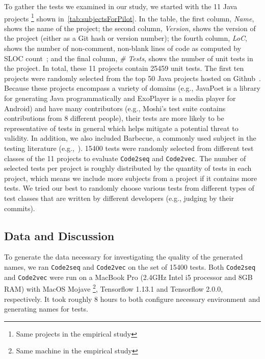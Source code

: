 \begin{appendices}
To gather the tests we examined in our study, we started with the \num{11} Java projects \footnote{Same projects in the empirical study} shown in~\cref{tab:subjectsForPilot}.
%
In the table, the first column, \emph{Name}, shows the name of the project; the second column, \emph{Version}, shows the version of the project (either as a Git hash or version number); the fourth column, \emph{LoC}, shows the number of non-comment, non-blank lines of code as computed by SLOC count~\cite{nguyen2007sloc}; and the final column, \emph{\# Tests}, shows the number of unit tests in the project. In total, these \num{11} projects contain \num{25459} unit tests.
%
The first ten projects were randomly selected from the top \num{50} Java projects hosted on Github~\cite{top50projects}.
%
Because these projects encompass a variety of domains (e.g., JavaPoet is a library for generating Java programmatically and ExoPlayer is a media player for Android) and have many contributors (e.g., Moshi’s test suite contains contributions from \num{8} different people), their tests are more likely to be representative of tests in general which helps mitigate a potential threat to validity.
%
In addition, we also included Barbecue, a commonly used subject in the testing literature (e.g.,~\cite{zhang2015automatically, zhang2016towards, wu2020pattern}).
\num{15400} tests were randomly selected from different test classes of the \num{11} projects to evaluate \texttt{Code2seq} and \texttt{Code2vec}.
%
The number of selected tests per project is roughly distributed by the quantity of tests in each project, which means we include more subjects from a project if it contains more tests.
%
We tried our best to randomly choose various tests from different types of test classes that are written by different developers (e.g., judging by their commits).


\subsection{Data and Discussion}

To generate the data necessary for investigating the quality of the generated names, we ran \texttt{Code2seq} and \texttt{Code2vec} on the set of \num{15400} tests.
%
Both \texttt{Code2seq} and \texttt{Code2vec} were run on a MacBook Pro (2.4GHz Intel i5 processor and 8GB RAM) with MacOS Mojave \footnote{Same machine in the empirical study}, Tensorflow 1.13.1 and Tensorflow 2.0.0, respectively.
It took roughly \num{8} hours to both configure necessary environment and generating names for tests.



\end{appendices}
